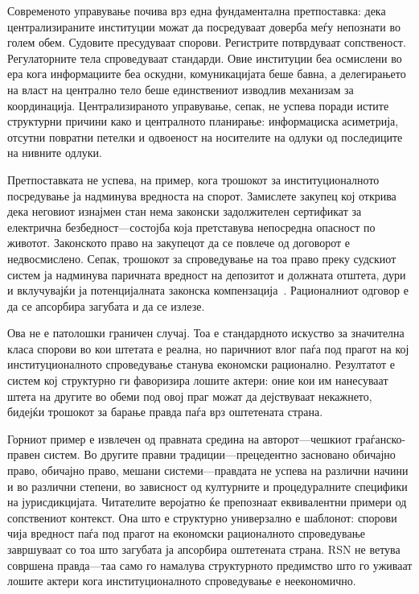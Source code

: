\documentclass[11pt,a4paper,twocolumn]{article}
\begin{document}
Современото управување почива врз една фундаментална претпоставка: дека централизираните институции можат да посредуваат доверба меѓу непознати во голем обем. Судовите пресудуваат спорови. Регистрите потврдуваат сопственост. Регулаторните тела спроведуваат стандарди. Овие институции беа осмислени во ера кога информациите беа оскудни, комуникацијата беше бавна, а делегирањето на власт на централно тело беше единствениот изводлив механизам за координација. Централизираното управување, сепак, не успева поради истите структурни причини како и централното планирање: информациска асиметрија, отсутни повратни петелки и одвоеност на носителите на одлуки од последиците на нивните одлуки.

Претпоставката не успева, на пример, кога трошокот за институционалното посредување ја надминува вредноста на спорот. Замислете закупец кој открива дека неговиот изнајмен стан нема законски задолжителен сертификат за електрична безбедност---состојба која претставува непосредна опасност по животот. Законското право на закупецот да се повлече од договорот е недвосмислено. Сепак, трошокот за спроведување на тоа право преку судскиот систем ја надминува паричната вредност на депозитот и должната отштета, дури и вклучувајќи ја потенцијалната законска компензација~\cite{czcourtfees}. Рационалниот одговор е да се апсорбира загубата и да се излезе.

Ова не е патолошки граничен случај. Тоа е стандардното искуство за значителна класа спорови во кои штетата е реална, но паричниот влог паѓа под прагот на кој институционалното спроведување станува економски рационално. Резултатот е систем кој структурно ги фаворизира лошите актери: оние кои им нанесуваат штета на другите во обеми под овој праг можат да дејствуваат некажнето, бидејќи трошокот за барање правда паѓа врз оштетената страна.

Горниот пример е извлечен од правната средина на авторот---чешкиот граѓанско-правен систем. Во другите правни традиции---прецедентно засновано обичајно право, обичајно право, мешани системи---правдата не успева на различни начини и во различни степени, во зависност од културните и процедуралните специфики на јурисдикцијата. Читателите веројатно ќе препознаат еквивалентни примери од сопствениот контекст. Она што е структурно универзално е шаблонот: спорови чија вредност паѓа под прагот на економски рационалното спроведување завршуваат со тоа што загубата ја апсорбира оштетената страна. RSN не ветува совршена правда---таа само го намалува структурното предимство што го уживаат лошите актери кога институционалното спроведување е неекономично.
\end{document}
